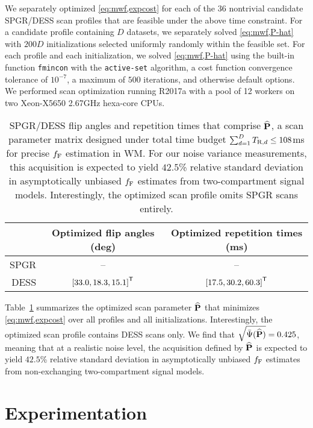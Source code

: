 We separately optimized \eqref{eq:mwf,expcost}
for each of the 36
nontrivial candidate SPGR/DESS scan profiles
that are feasible under the above time constraint.
For a candidate profile containing $D$ datasets,
we separately solved \eqref{eq:mwf,P-hat}
with $200D$ initializations
selected uniformly randomly 
within the feasible set.
For each profile
and each initialization,
we solved \eqref{eq:mwf,P-hat}
using the built-in \matlab function \texttt{fmincon}
with the \texttt{active-set} algorithm,
a cost function convergence tolerance of $10^{-7}$,
a maximum of $500$ iterations,
and otherwise default options.
We performed scan optimization
running \matlab R2017a 
with a pool of 12 workers
on two Xeon-X5650 2.67GHz hexa-core CPUs.

\begin{table}[!tb]
  \centering
  \begin{tabular}{r | c | c}
    \hline
    \hline
    & Optimized flip angles (deg) & Optimized repetition times (ms) \\
    \hline
    SPGR & -- 														& -- \\
    DESS & $\brac{33.0,18.3,15.1}\tpose$ 	& $\brac{17.5,30.2,60.3}\tpose$ \\
    \hline
    \hline
  \end{tabular}
  \caption{
		SPGR/DESS flip angles and repetition times
		that comprise $\widehat{\mathbf{P}}$,
		a scan parameter matrix designed
		under total time budget 
		$\sum_{d=1}^D T_{\mathrm{R},d} \leq 108$ms
		for precise $f_{\mathrm{F}}$ estimation in WM.
		For our noise variance measurements,
		this acquisition is expected
		to yield $42.5$\% relative standard deviation
		in asymptotically unbiased $f_{\mathrm{F}}$ estimates
		from two-compartment signal models.
		Interestingly,
		the optimized scan profile
		omits SPGR scans entirely.
  }
  \label{tab:mwf,acq}
\end{table}

Table~\ref{tab:mwf,acq} summarizes
the optimized scan parameter $\widehat{\mathbf{P}}$ 
that minimizes \eqref{eq:mwf,expcost}
over all profiles and all initializations.
Interestingly,
the optimized scan profile 
contains DESS scans only.
We find that $\sqrt{\bar{\Psi}(\widehat{\mathbf{P}})} = 0.425$, 
meaning that at a realistic noise level,
the acquisition defined by $\widehat{\mathbf{P}}$
is expected to yield $42.5$\% relative standard deviation
in asymptotically unbiased $f_{\mathrm{F}}$ estimates
from non-exchanging two-compartment signal models.

\section{Experimentation}
\label{s,mwf,exp}


